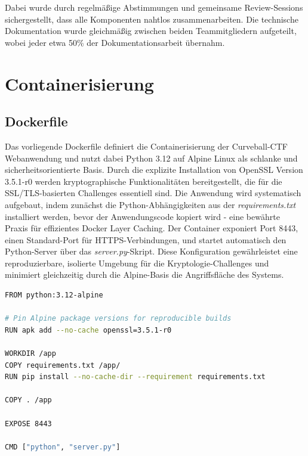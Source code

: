 \documentclass{article}
\begin{document}
\noindent Dabei wurde durch regelmäßige Abstimmungen und gemeinsame Review-Sessions sichergestellt, dass alle Komponenten nahtlos zusammenarbeiten. Die technische Dokumentation wurde gleichmäßig zwischen beiden Teammitgliedern aufgeteilt, wobei jeder etwa 50\% der Dokumentationsarbeit übernahm.

\newpage

\section{Containerisierung}
\subsection{Dockerfile}
Das vorliegende Dockerfile definiert die Containerisierung der Curveball-CTF Webanwendung und nutzt dabei Python 3.12 auf Alpine Linux als schlanke und sicherheitsorientierte Basis. Durch die explizite Installation von OpenSSL Version 3.5.1-r0 werden kryptographische Funktionalitäten bereitgestellt, die für die SSL/TLS-basierten Challenges essentiell sind. Die Anwendung wird systematisch aufgebaut, indem zunächst die Python-Abhängigkeiten aus der \emph{requirements.txt} installiert werden, bevor der Anwendungscode kopiert wird - eine bewährte Praxis für effizientes Docker Layer Caching. Der Container exponiert Port 8443, einen Standard-Port für HTTPS-Verbindungen, und startet automatisch den Python-Server über das \emph{server.py}-Skript. Diese Konfiguration gewährleistet eine reproduzierbare, isolierte Umgebung für die Kryptologie-Challenges und minimiert gleichzeitig durch die Alpine-Basis die Angriffsfläche des Systems.

\vspace{1cm}

\begin{lstlisting}[language=bash,caption={Auszug aus dem finalen Dockerfile}]
FROM python:3.12-alpine

# Pin Alpine package versions for reproducible builds
RUN apk add --no-cache openssl=3.5.1-r0

WORKDIR /app
COPY requirements.txt /app/
RUN pip install --no-cache-dir --requirement requirements.txt

COPY . /app

EXPOSE 8443

CMD ["python", "server.py"]

\end{lstlisting}
\end{document}
